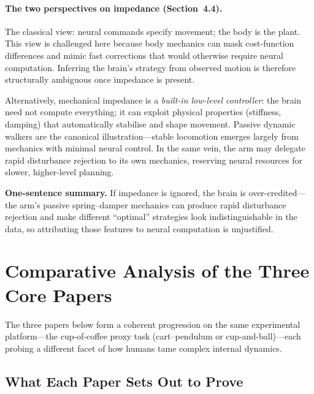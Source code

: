 \documentclass[11pt]{article}
\begin{document}
\paragraph{The two perspectives on impedance (Section~4.4).}
\begin{description}[leftmargin=1.4em,style=nextline]
  \item[\emph{Brain controls the body.}]  The classical view: neural commands specify movement; the body is the plant.  This view is challenged here because body mechanics can mask cost-function differences and mimic fast corrections that would otherwise require neural computation.  Inferring the brain's strategy from observed motion is therefore structurally ambiguous once impedance is present.
  \item[\emph{Brain and body work together.}]  Alternatively, mechanical impedance is a \emph{built-in low-level controller}: the brain need not compute everything; it can exploit physical properties (stiffness, damping) that automatically stabilise and shape movement.  Passive dynamic walkers are the canonical illustration---stable locomotion emerges largely from mechanics with minimal neural control.  In the same vein, the arm may delegate rapid disturbance rejection to its own mechanics, reserving neural resources for slower, higher-level planning.
\end{description}

\noindent
\textbf{One-sentence summary.}  If impedance is ignored, the brain is over-credited---the arm's passive spring--damper mechanics can produce rapid disturbance rejection and make different ``optimal'' strategies look indistinguishable in the data, so attributing those features to neural computation is unjustified.

\pagebreak
\section*{Comparative Analysis of the Three Core Papers}

The three papers below form a coherent progression on the same experimental platform---the cup-of-coffee proxy task (cart--pendulum or cup-and-ball)---each probing a different facet of how humans tame complex internal dynamics.

\subsection*{What Each Paper Sets Out to Prove}
\end{document}
